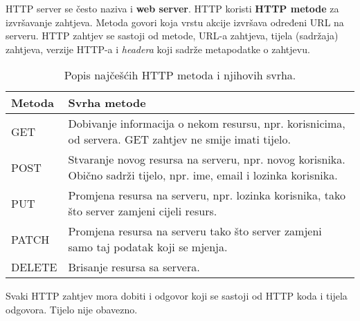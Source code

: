 HTTP server se često naziva i \textbf{web server}.
HTTP koristi \textbf{HTTP metode} za izvršavanje zahtjeva.
Metoda govori koja vrstu akcije izvršava određeni URL na serveru.
HTTP zahtjev se sastoji od metode, URL-a zahtjeva, tijela (sadržaja) zahtjeva, verzije HTTP-a i \textit{headera} koji sadrže metapodatke o zahtjevu.

\begin{table}[]
    \begin{tabular}{|l|l|}
        \hline
        \textbf{Metoda} & \textbf{Svrha metode}                                                                                                \\ \hline
        GET             & Dobivanje informacija o nekom resursu, npr. korisnicima, od servera. GET zahtjev ne smije imati tijelo.              \\ \hline
        POST            & Stvaranje novog resursa na serveru, npr. novog korisnika. Obično sadrži tijelo, npr. ime, email i lozinka korisnika. \\ \hline
        PUT             & Promjena resursa na serveru, npr. lozinka korisnika, tako što server zamjeni cijeli resurs.                          \\ \hline
        PATCH           & Promjena resursa na serveru tako što server zamjeni samo taj podatak koji se mjenja.                                 \\ \hline
        DELETE          & Brisanje resursa sa servera.                                                                                         \\ \hline
    \end{tabular}
    \caption{Popis najčešćih HTTP metoda i njihovih svrha.}
    \label{table:http-metode}
\end{table}

Svaki HTTP zahtjev mora dobiti i odgovor koji se sastoji od HTTP koda i tijela odgovora.
Tijelo nije obavezno.

